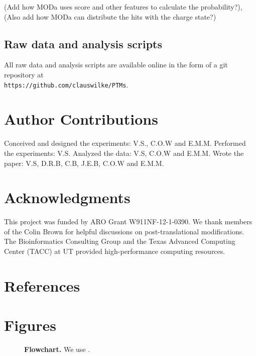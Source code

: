 \documentclass[12pt]{article}
\begin{document}
(Add how MODa uses score and other features to calculate the probability?), (Also add how MODa can distribute the hits with the charge state?)

\subsection{Raw data and analysis scripts}

All raw data and analysis scripts are available online in the form of a git repository at\\ \texttt{https://github.com/clauswilke/PTMs}.


\section{Author Contributions}
Conceived and designed the experiments: V.S., C.O.W and E.M.M. Performed the experiments: V.S. Analyzed the data: V.S, C.O.W and E.M.M. Wrote the paper: V.S, D.R.B, C.B, J.E.B, C.O.W and E.M.M.

\section{Acknowledgments}
This project was funded by ARO Grant W911NF-12-1-0390. We thank members of the Colin Brown for helpful discussions on post-translational modifications. The Bioinformatics Consulting Group and the Texas Advanced Computing Center (TACC) at UT provided high-performance computing resources. 


\section{References}


\newpage

\section*{Figures}

\begin{figure}[!ht]
\caption{\label{fig:flowchart}\textbf{Flowchart.} We use .
}
\end{figure}
\end{document}
